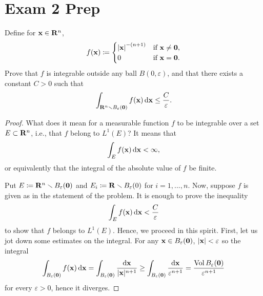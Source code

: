 \section{Exam 2 Prep}
\begin{problem}
Define for $\mathbf{x}\in\mathbf{R}^n$,
\[
f(\mathbf{x})\coloneqq
\begin{cases}
\left|\mathbf{x}\right|^{-(n+1)}&\text{if $\mathbf{x}\neq \mathbf{0}$,}\\
0&\text{if $\mathbf{x}=\mathbf{0}$.}
\end{cases}
\]
Prove that $f$ is integrable outside any ball $B(0,\varepsilon)$, and that
there exists a constant $C>0$ such that
\[
\int_{\mathbf{R}^n\smallsetminus B_\varepsilon(\mathbf{0})}f(\mathbf{x})\mathop{}\!\mathrm{d}\mathbf{x}\leq\frac{C}{\varepsilon}.
\]
\end{problem}
\begin{proof}
What does it mean for a measurable function $f$ to be integrable over a set
$E\subset\mathbf{R}^n$, i.e., that $f$ belong to $L^1(E)$? It means that
\[
\int_E f(\mathbf{x})\mathop{}\!\mathrm{d}\mathbf{x}<\infty,
\]
or equivalently that the integral of the absolute value of $f$ be
finite.

Put $E\coloneqq\mathbf{R}^n\smallsetminus B_\varepsilon(\mathbf{0})$ and
$E_i\coloneqq\mathbf{R}\smallsetminus B_\varepsilon(0)$ for $i=1,...,n$. Now, suppose $f$
is given as in the statement of the problem. It is enough to prove the
inequality
\begin{equation}
  \label{eq:given-inequality-1}
\int_E f(\mathbf{x})\mathop{}\!\mathrm{d}\mathbf{x}<\frac{C}{\varepsilon}
\end{equation}
to show that $f$ belongs to $L^1(E)$. Hence, we proceed in this
spirit. First, let us jot down some estimates on the integral. For any
$\mathbf{x}\in B_\varepsilon(\mathbf{0})$, $|\mathbf{x}|<\varepsilon$ so the integral
\begin{equation}
\label{eq:divergent-estimate-1}
\int_{B_\varepsilon(\mathbf{0})}f(\mathbf{x})\mathop{}\!\mathrm{d}\mathbf{x}=
\int_{B_\varepsilon(\mathbf{0})}\frac{\mathop{}\!\mathrm{d}\mathbf{x}}{|\mathbf{x}|^{n+1}}\geq
\int_{B_\varepsilon(\mathbf{0})}\frac{\mathop{}\!\mathrm{d}\mathbf{x}}{\varepsilon^{n+1}}=
\frac{\operatorname{Vol} B_\varepsilon(\mathbf{0})}{\varepsilon^{n+1}}
\end{equation}
for every $\varepsilon>0$, hence it diverges.


\end{proof}
